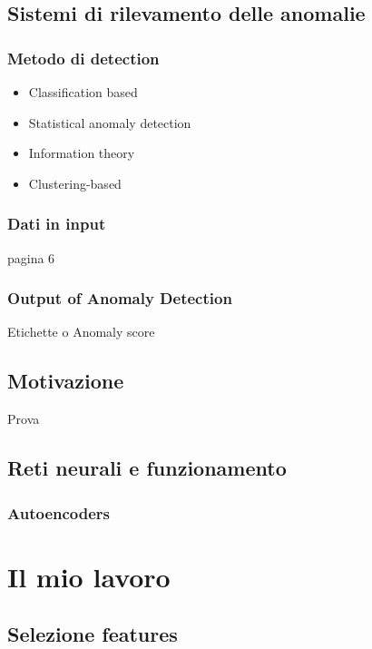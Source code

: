 \section{Sistemi di rilevamento delle anomalie}

\subsection{Metodo di detection}
\begin{itemize}
    \item Classification based
    \item Statistical anomaly detection
    \item Information theory
    \item Clustering-based
\end{itemize}

\subsection{Dati in input}
pagina 6 \cite{anomaly_detection_survey_3}

\subsection{Output of Anomaly Detection}

Etichette o Anomaly score



\section{Motivazione}
Prova 


\section{Reti neurali e funzionamento}



\subsection{Autoencoders}


\chapter{Il mio lavoro}


\section{Selezione features}
